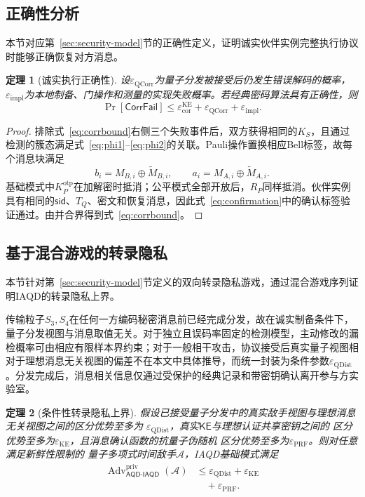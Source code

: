 \documentclass[UTF8,10pt,a4paper]{ctexart}
\theoremstyle{aqdplain}
\newtheorem{theorem}{定理}
\newcommand{\Adv}{\operatorname{Adv}}
\newcommand{\Prb}{\Pr}
\newcommand{\sid}{\mathsf{sid}}
\newcommand{\prot}{\mathsf{AQD\mbox{-}IAQD}}
\begin{document}
\subsection{正确性分析}

本节对应第~\ref{sec:security-model}节的正确性定义，证明诚实伙伴实例完整执行协议时能够正确恢复对方消息。

\begin{theorem}[诚实执行正确性]
设$\varepsilon_{\mathrm{QCorr}}$为量子分发被接受后仍发生错误解码的概率，$\varepsilon_{\mathrm{impl}}$为本地制备、门操作和测量的实现失败概率。若经典密码算法具有正确性，则
\begin{equation}
\Prb[\mathsf{CorrFail}]
\leq \varepsilon_{\mathrm{cor}}^{\mathrm{KE}}
+\varepsilon_{\mathrm{QCorr}}+\varepsilon_{\mathrm{impl}}.
\label{eq:corrbound}
\end{equation}
\end{theorem}

\begin{proof}
排除式~\eqref{eq:corrbound}右侧三个失败事件后，双方获得相同的$K_S$，且通过检测的簇态满足式~\eqref{eq:phi1}--\eqref{eq:phi2}的关联。Pauli操作置换相应Bell标签，故每个消息块满足
\[
b_i=M_{B,i}\oplus\widetilde M_{B,i},
\qquad
a_i=M_{A,i}\oplus\widetilde M_{A,i}.
\]
基础模式中$K_P^{\mathrm{otp}}$在加解密时抵消；公平模式全部开放后，$R_P$同样抵消。伙伴实例具有相同的$\sid$、$T_Q$、密文和恢复消息，因此式~\eqref{eq:confirmation}中的确认标签验证通过。由并合界得到式~\eqref{eq:corrbound}。
\end{proof}

\subsection{基于混合游戏的转录隐私}

本节针对第~\ref{sec:security-model}节定义的双向转录隐私游戏，通过混合游戏序列证明IAQD的转录隐私上界。

传输粒子$S_3,S_4$在任何一方编码秘密消息前已经完成分发，故在诚实制备条件下，量子分发视图与消息取值无关。对于独立且误码率固定的检测模型，主动修改的漏检概率可由相应有限样本界约束；对于一般相干攻击，协议接受后真实量子视图相对于理想消息无关视图的偏差不在本文中具体推导，而统一封装为条件参数$\varepsilon_{\mathrm{QDist}}$。分发完成后，消息相关信息仅通过受保护的经典记录和带密钥确认离开参与方实验室。

\begin{theorem}[条件性转录隐私上界]
假设已接受量子分发中的真实敌手视图与理想消息无关视图之间的区分优势至多为
$\varepsilon_{\mathrm{QDist}}$，真实$\mathsf{KE}$与理想认证共享密钥之间的
区分优势至多为$\varepsilon_{\mathrm{KE}}$，且消息确认函数的抗量子伪随机
区分优势至多为$\varepsilon_{\mathrm{PRF}}$。则对任意满足新鲜性限制的
量子多项式时间敌手$\mathcal A$，IAQD基础模式满足
\begin{equation}
\begin{aligned}
\Adv_{\prot}^{\mathrm{priv}}(\mathcal A)
&\leq \varepsilon_{\mathrm{QDist}}
+\varepsilon_{\mathrm{KE}}\\
&\quad+\varepsilon_{\mathrm{PRF}}.
\end{aligned}
\label{eq:privacybound}
\end{equation}
\end{theorem}
\end{document}
